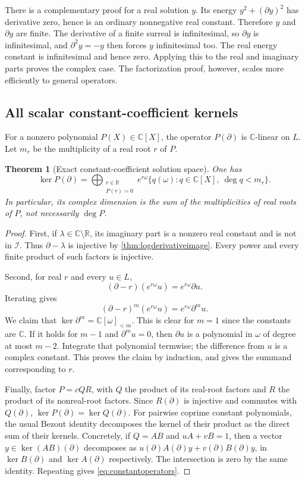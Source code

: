 \documentclass[11pt]{article}
\numberwithin{equation}{section}
\newtheorem{theorem}{Theorem}[section]
\theoremstyle{definition}
\newcommand{\R}{\mathbb R}
\newcommand{\C}{\mathbb C}
\newcommand{\II}{\mathcal I}
\newcommand{\DD}{\partial}
\begin{document}
There is a complementary proof for a real solution $y$. Its energy
$y^2+(\DD y)^2$ has derivative zero, hence is an ordinary nonnegative
real constant. Therefore $y$ and $\DD y$ are finite. The derivative of
a finite surreal is infinitesimal, so $\DD y$ is infinitesimal, and
$\DD^2y=-y$ then forces $y$ infinitesimal too. The real energy constant
is infinitesimal and hence zero. Applying this to the real and imaginary
parts proves the complex case. The factorization proof, however, scales
more efficiently to general operators.

\subsection{All scalar constant-coefficient kernels}
For a nonzero polynomial $P(X)\in\C[X]$, the operator $P(\DD)$ is
$\C$-linear on $L$. Let $m_r$ be the multiplicity of a real root $r$ of
$P$.

\begin{theorem}[Exact constant-coefficient solution space]
\label{thm:constantoperators}
One has
\begin{equation}\label{eq:constantoperators}
 \ker P(\DD)=
 \bigoplus_{\substack{r\in\R\\P(r)=0}}
   e^{r\omega}\{q(\omega):q\in\C[X],\ \deg q<m_r\}.
\end{equation}
In particular, its complex dimension is the sum of the multiplicities of
\emph{real} roots of $P$, not necessarily $\deg P$.
\end{theorem}
\begin{proof}
First, if $\lambda\in\C\setminus\R$, its imaginary part is a
nonzero real constant and is not in $\II$. Thus $\DD-\lambda$ is
injective by \cref{thm:logderivativeimage}. Every power and every finite
product of such factors is injective.

Second, for real $r$ and every $u\in L$,
\[
 (\DD-r)(e^{r\omega}u)=e^{r\omega}\DD u.
\]
Iterating gives
\[
 (\DD-r)^m(e^{r\omega}u)=e^{r\omega}\DD^m u.
\]
We claim that $\ker\DD^m=\C[\omega]_{<m}$. This is clear for
$m=1$ since the constants are $\C$. If it holds for $m-1$ and
$\DD^m u=0$, then $\DD u$ is a polynomial in $\omega$ of degree
at most $m-2$. Integrate that polynomial termwise; the difference from
$u$ is a complex constant. This proves the claim by induction, and gives
the summand corresponding to $r$.

Finally, factor $P=cQR$, with $Q$ the product of its real-root factors
and $R$ the product of its nonreal-root factors. Since $R(\DD)$ is
injective and commutes with $Q(\DD)$,
$\ker P(\DD)=\ker Q(\DD)$. For pairwise coprime constant
polynomials, the usual Bezout identity decomposes the kernel of their
product as the direct sum of their kernels. Concretely, if $Q=AB$ and
$uA+vB=1$, then a vector $y\in\ker(AB)(\DD)$ decomposes as
$u(\DD)A(\DD)y+v(\DD)B(\DD)y$, in $\ker B(\DD)$ and
$\ker A(\DD)$ respectively. The intersection is zero by the same
identity. Repeating gives \eqref{eq:constantoperators}.
\end{proof}
\end{document}
